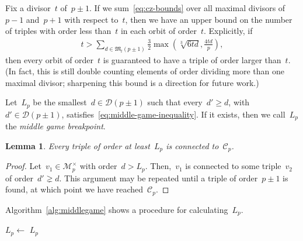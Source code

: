 \documentclass{article}
\newtheorem{lemma}{Lemma}
\theoremstyle{definition}
\theoremstyle{remark}
\begin{document}
Fix a divisor~$t$ of~$p \pm 1$.
If we sum~\eqref{eq:cz-bounds} over all maximal divisors of~$p - 1$ and~$p + 1$ with respect to~$t$, then we have an upper bound on the number of triples with order less than~$t$ in each orbit of order~$t$.
Explicitly, if
\begin{align}
        t > \sum_{d \in \mathfrak{M}_t(p \pm 1)} \frac{3}{2}\max\left(\sqrt[3]{6td}, \frac{4td}{p}\right), \label{eq:middle-game-inequality}
\end{align}
then every orbit of order~$t$ is guaranteed to have a triple of order larger than~$t$.
(In fact, this is still double counting elements of order dividing more than one maximal divisor; sharpening this bound is a direction for future work.)

Let~$L_p$ be the smallest~$d \in \mathcal{D}(p \pm 1)$ such that every~$d' \geq d$, with $d' \in \mathcal{D}(p \pm 1)$, satisfies~\eqref{eq:middle-game-inequality}.
If it exists, then we call~$L_p$ the \textit{middle game breakpoint}.

\begin{lemma}\label{lem:middle-game}
    Every triple of order at least~$L_p$ is connected to~$\mathcal{C}_p$.
\end{lemma}
\begin{proof}
    Let~$v_1 \in \mathcal{M}_p^\times$ with order~$d > L_p$.
    Then,~$v_1$ is connected to some triple~$v_2$ of order~$d' \gneq d$.
    This argument may be repeated until a triple of order~$p \pm 1$ is found, at which point we have reached~$\mathcal{C}_p$.
\end{proof}

Algorithm~\ref{alg:middlegame} shows a procedure for calculating~$L_p$.
\begin{algorithm}[h]
        \SetAlgoLined%

        $L_p \leftarrow$ \None\;
        \Return $L_p$\;

        \caption{Finding the middle game breakpoint $L_p$.}%
        \label{alg:middlegame}
\end{algorithm}%
\end{document}
